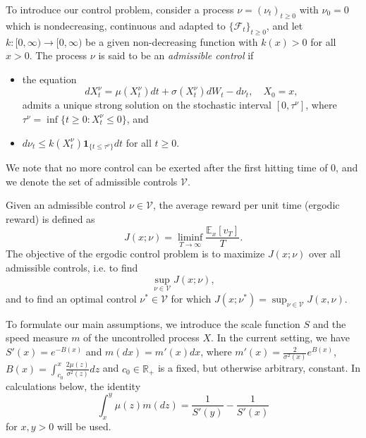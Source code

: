 \documentclass[12pt]{article}
\begin{document}
To introduce our control problem, consider a process $\nu=(\nu_t)_{t\geq 0}$ with $\nu_0=0$ which is nondecreasing, continuous and adapted to $\{\mathcal{F}_t\}_{t \geq 0}$, and let $k:[0,\infty)\to[0,\infty)$ be a given non-decreasing function with $k(x)>0$ for all $x>0$. 
The process $\nu$ is said to be an {\em admissible control} if 
\begin{itemize}
\item the equation 
\begin{equation} \label{Eq:ControlledDiffusion}
    dX^{\nu}_{t} = \mu(X^{\nu}_{t}) dt + \sigma(X^{\nu}_{t}) dW_{t} - d\nu_{t}, \quad X_0 = x,
\end{equation}
admits a unique strong solution on the stochastic interval $[0,\tau^\nu]$, where 
$\tau^\nu=\inf\{t\geq 0:X^\nu_t\leq 0\}$, and 
\item 
$d\nu_t\leq k(X^\nu_t)\mathbf 1_{\{t\leq \tau^\nu\}} dt$ for all $t\geq 0$.
\end{itemize}
We note that no more control can be exerted after the first hitting time of $0$, and we
denote the set of admissible controls $\mathcal{V}$. 

Given an admissible control $\nu\in\mathcal V$, the average reward per unit time (ergodic reward) is defined as
\begin{equation*} 
    J(x; \nu) = \liminf_{T \to \infty} \frac{\mathbb{E}_x [v_T]}{T} .
\end{equation*}
The objective of the ergodic control problem is to maximize $J(x; \nu)$ over all admissible controls, i.e. to find
\begin{equation} \label{Eq:ControlProblemFormulation}
    \sup_{\nu \in \mathcal{V}}  J(x;\nu),
\end{equation}
and to find an optimal control $\nu^*\in\mathcal V$ for which $J(x;\nu^*)=\sup_{\nu \in \mathcal{V}}  J(x,\nu)$.

To formulate our main assumptions, we introduce the scale function $S$ and the speed measure $m$ of the uncontrolled process $X$. In the current setting, we have 
$S'(x) = e^{-B(x)}$ and $m(dx) = m'(x)dx$, where $m'(x)=\frac{2}{\sigma^2(x)} e^{B(x)}$,
$B(x) = \int_{c_0}^x \frac{2\mu(z)}{\sigma^2(z)}dz$ and $c_0 \in \mathbb{R}_+$ is a fixed, but  otherwise arbitrary, constant. 
In calculations below, the identity 
\begin{equation} \label{Eq:ScaleDriftInt}
    \int_x^y \mu(z)m(dz) = \frac{1}{S'(y)}-\frac{1}{S'(x)}
\end{equation}
for $x,y>0$ will be used.
\end{document}
